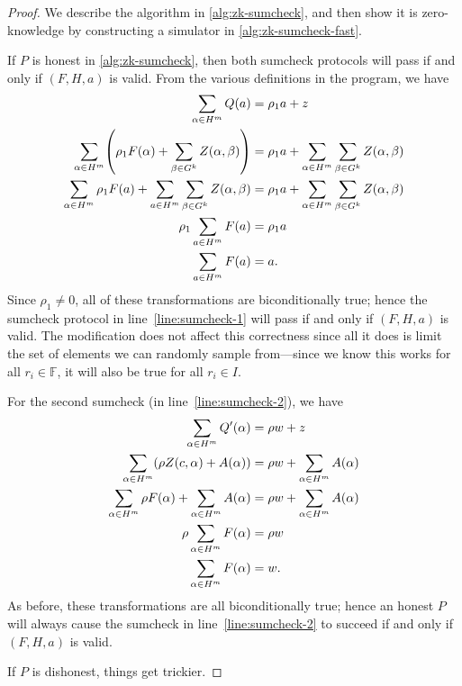 \documentclass[english]{reedthesis}
\theoremstyle{plain}
\theoremstyle{definition}
\theoremstyle{remark}
\begin{document}
\begin{proof}
  We describe the algorithm in \cref{alg:zk-sumcheck}, and then show it is
  zero-knowledge by constructing a simulator in \cref{alg:zk-sumcheck-fast}.

  If $P$ is honest in \cref{alg:zk-sumcheck}, then both sumcheck protocols will
  pass if and only if $(F, H, a)$ is valid. From the various definitions in the
  program, we have
  \begin{align*}
    \sum_{\alpha \in H^{m}}Q(a) &= \rho_{1}a + z \\
    \sum_{\alpha \in H^{m}}\mleft(\rho_{1}F(\alpha) + \sum_{\beta \in G^{k}}Z(\alpha, \beta)\mright) &= \rho_{1}a + \sum_{\alpha \in H^{m}}\sum_{\beta \in G^{k}}Z(\alpha, \beta) \\
    \sum_{\alpha \in H^{m}}\rho_{1}F(a) + \sum_{a \in H^{m}}\sum_{\beta \in G^{k}}Z(\alpha, \beta) &= \rho_{1}a + \sum_{\alpha \in H^{m}}\sum_{\beta \in G^{k}}Z(\alpha, \beta) \\
    \rho_{1}\sum_{a \in H^{m}}F(a) &= \rho_{1}a \\
    \sum_{a \in H^{m}}F(a) &= a.
  \end{align*}
  Since $\rho_{1} \ne 0$, all of these transformations are biconditionally true;
  hence the sumcheck protocol in line~\ref{line:sumcheck-1} will pass if and
  only if $(F, H, a)$ is valid. The modification does not affect this
  correctness since all it does is limit the set of elements we can randomly
  sample from---since we know this works for all $r_{i} \in \mathbb{F}$, it will
  also be true for all $r_{i} \in I$.

  For the second sumcheck (in line~\ref{line:sumcheck-2}), we have
  \begin{align*}
    \sum_{\alpha \in H^{m}}Q'(\alpha) &= \rho w + z \\
    \sum_{\alpha \in H^{m}}\mleft(\rho Z(c, \alpha) + A(\alpha)\mright) &= \rho w + \sum_{\alpha \in H^{m}}A(\alpha) \\
    \sum_{\alpha \in H^{m}}\rho F(\alpha) + \sum_{\alpha \in H^{m}}A(\alpha) &= \rho w + \sum_{\alpha \in H^{m}}A(\alpha) \\
    \rho\sum_{\alpha \in H^{m}}F(\alpha) &= \rho w \\
    \sum_{\alpha \in H^{m}}F(\alpha) &= w.
  \end{align*}
  As before, these transformations are all biconditionally true; hence an honest
  $P$ will always cause the sumcheck in line~\ref{line:sumcheck-2} to succeed if
  and only if $(F, H, a)$ is valid.

  If $P$ is dishonest, things get trickier.
\end{proof}
\end{document}
